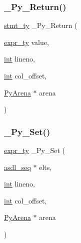 \mbox{\label{_python-ast_8h_a7119d853ac5d21a0aab782a16be84c6d}} 
\subsubsection{\texorpdfstring{\_Py\_Return()}{\_Py\_Return()}}
{\footnotesize\ttfamily \mbox{\hyperlink{_python-ast_8h_a39618071027b661bc03e8916e664e1a7}{stmt\+\_\+ty}} \+\_\+\+Py\+\_\+\+Return (\begin{DoxyParamCaption}\item[{\mbox{\hyperlink{_python-ast_8h_a56d3705e020a071405094a220c4592bd}{expr\+\_\+ty}}}]{value,  }\item[{\mbox{\hyperlink{warnings_8h_a74f207b5aa4ba51c3a2ad59b219a423b}{int}}}]{lineno,  }\item[{\mbox{\hyperlink{warnings_8h_a74f207b5aa4ba51c3a2ad59b219a423b}{int}}}]{col\+\_\+offset,  }\item[{\mbox{\hyperlink{pyarena_8h_a9edeb357fbb27333471022a0975adb7a}{Py\+Arena}} $\ast$}]{arena }\end{DoxyParamCaption})}

\mbox{\label{_python-ast_8h_adf1513b1fa378e46c866f0bb85194b5f}} 
\subsubsection{\texorpdfstring{\_Py\_Set()}{\_Py\_Set()}}
{\footnotesize\ttfamily \mbox{\hyperlink{_python-ast_8h_a56d3705e020a071405094a220c4592bd}{expr\+\_\+ty}} \+\_\+\+Py\+\_\+\+Set (\begin{DoxyParamCaption}\item[{\mbox{\hyperlink{structasdl__seq}{asdl\+\_\+seq}} $\ast$}]{elts,  }\item[{\mbox{\hyperlink{warnings_8h_a74f207b5aa4ba51c3a2ad59b219a423b}{int}}}]{lineno,  }\item[{\mbox{\hyperlink{warnings_8h_a74f207b5aa4ba51c3a2ad59b219a423b}{int}}}]{col\+\_\+offset,  }\item[{\mbox{\hyperlink{pyarena_8h_a9edeb357fbb27333471022a0975adb7a}{Py\+Arena}} $\ast$}]{arena }\end{DoxyParamCaption})}

